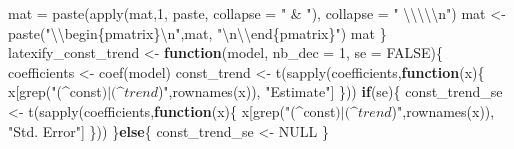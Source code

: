 \documentclass[
  11pt,
]{article}
\newenvironment{Shaded}{\begin{snugshade}}{\end{snugshade}}
\newcommand{\AttributeTok}[1]{\textcolor[rgb]{0.77,0.63,0.00}{#1}}
\newcommand{\ConstantTok}[1]{\textcolor[rgb]{0.00,0.00,0.00}{#1}}
\newcommand{\ControlFlowTok}[1]{\textcolor[rgb]{0.13,0.29,0.53}{\textbf{#1}}}
\newcommand{\DecValTok}[1]{\textcolor[rgb]{0.00,0.00,0.81}{#1}}
\newcommand{\FunctionTok}[1]{\textcolor[rgb]{0.00,0.00,0.00}{#1}}
\newcommand{\NormalTok}[1]{#1}
\newcommand{\OtherTok}[1]{\textcolor[rgb]{0.56,0.35,0.01}{#1}}
\newcommand{\SpecialCharTok}[1]{\textcolor[rgb]{0.00,0.00,0.00}{#1}}
\newcommand{\StringTok}[1]{\textcolor[rgb]{0.31,0.60,0.02}{#1}}
\begin{document}
\begin{Shaded}
\begin{Highlighting}[]
\NormalTok{    mat }\OtherTok{=} \FunctionTok{paste}\NormalTok{(}\FunctionTok{apply}\NormalTok{(mat,}\DecValTok{1}\NormalTok{, paste, }\AttributeTok{collapse =} \StringTok{" \& "}\NormalTok{), }\AttributeTok{collapse =} \StringTok{" }\SpecialCharTok{\textbackslash{}\textbackslash{}\textbackslash{}\textbackslash{}\textbackslash{}n}\StringTok{"}\NormalTok{)}
\NormalTok{    mat }\OtherTok{\textless{}{-}} \FunctionTok{paste}\NormalTok{(}\StringTok{"}\SpecialCharTok{\textbackslash{}\textbackslash{}}\StringTok{begin\{pmatrix\}}\SpecialCharTok{\textbackslash{}n}\StringTok{"}\NormalTok{,mat,}
                 \StringTok{"}\SpecialCharTok{\textbackslash{}n\textbackslash{}\textbackslash{}}\StringTok{end\{pmatrix\}"}\NormalTok{)}
\NormalTok{    mat}
\NormalTok{\}}
\NormalTok{latexify\_const\_trend }\OtherTok{\textless{}{-}} \ControlFlowTok{function}\NormalTok{(model, }\AttributeTok{nb\_dec =} \DecValTok{1}\NormalTok{, }\AttributeTok{se =} \ConstantTok{FALSE}\NormalTok{)\{}
\NormalTok{    coefficients }\OtherTok{\textless{}{-}} \FunctionTok{coef}\NormalTok{(model)}
\NormalTok{    const\_trend }\OtherTok{\textless{}{-}} \FunctionTok{t}\NormalTok{(}\FunctionTok{sapply}\NormalTok{(coefficients,}\ControlFlowTok{function}\NormalTok{(x)\{}
\NormalTok{        x[}\FunctionTok{grep}\NormalTok{(}\StringTok{"(\^{}const$)|(\^{}trend$)"}\NormalTok{,}\FunctionTok{rownames}\NormalTok{(x)), }\StringTok{"Estimate"}\NormalTok{]}
\NormalTok{    \})) }
    \ControlFlowTok{if}\NormalTok{(se)\{}
\NormalTok{        const\_trend\_se }\OtherTok{\textless{}{-}} \FunctionTok{t}\NormalTok{(}\FunctionTok{sapply}\NormalTok{(coefficients,}\ControlFlowTok{function}\NormalTok{(x)\{}
\NormalTok{            x[}\FunctionTok{grep}\NormalTok{(}\StringTok{"(\^{}const$)|(\^{}trend$)"}\NormalTok{,}\FunctionTok{rownames}\NormalTok{(x)), }\StringTok{"Std. Error"}\NormalTok{]}
\NormalTok{        \}))  }
\NormalTok{    \}}\ControlFlowTok{else}\NormalTok{\{}
\NormalTok{        const\_trend\_se }\OtherTok{\textless{}{-}} \ConstantTok{NULL}
\NormalTok{    \}}
    

\end{Highlighting}
\end{Shaded}
\end{document}
